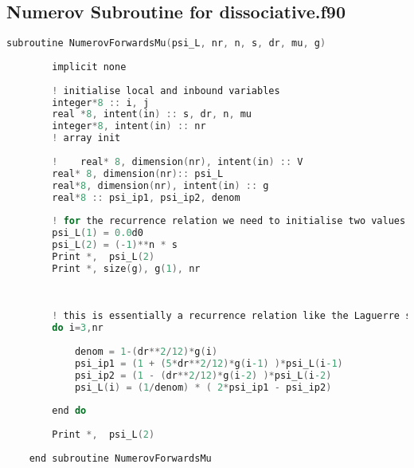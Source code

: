 \documentclass{article}
\begin{document}
   \subsection{Numerov Subroutine for dissociative.f90}
   \begin{lstlisting}[language=C, label=Muforwrads]
   	subroutine NumerovForwardsMu(psi_L, nr, n, s, dr, mu, g)
   	
	   	implicit none
	   	
	   	! initialise local and inbound variables
	   	integer*8 :: i, j
	   	real *8, intent(in) :: s, dr, n, mu
	   	integer*8, intent(in) :: nr
	   	! array init
	   	
	   	!    real* 8, dimension(nr), intent(in) :: V
	   	real* 8, dimension(nr):: psi_L
	   	real*8, dimension(nr), intent(in) :: g
	   	real*8 :: psi_ip1, psi_ip2, denom
	   	
	   	! for the recurrence relation we need to initialise two values of psi
	   	psi_L(1) = 0.0d0
	   	psi_L(2) = (-1)**n * s
	   	Print *,  psi_L(2)
	   	Print *, size(g), g(1), nr
	   	
	   	
	   	
	   	! this is essentially a recurrence relation like the Laguerre situation
	   	do i=3,nr
	   	
		   	denom = 1-(dr**2/12)*g(i)
		   	psi_ip1 = (1 + (5*dr**2/12)*g(i-1) )*psi_L(i-1)
		   	psi_ip2 = (1 - (dr**2/12)*g(i-2) )*psi_L(i-2)
		   	psi_L(i) = (1/denom) * ( 2*psi_ip1 - psi_ip2)
	   	
	   	end do
	   	
	   	Print *,  psi_L(2)
   	
   	end subroutine NumerovForwardsMu
   \end{lstlisting}
    

	
\end{document}
